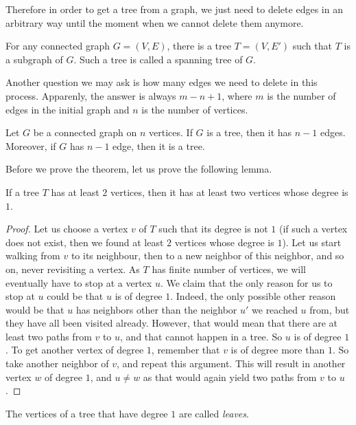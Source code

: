 Therefore in order to get a tree from a graph, we just need to delete edges
in an arbitrary way until the moment when we cannot delete them anymore.
\begin{corollary}
  For any connected graph $G = (V, E)$, there is a tree $T = (V, E')$ such
  that $T$ is a subgraph of $G$. Such a tree is called a spanning tree of $G$.
\end{corollary}

Another question we may ask is how many edges we need to delete in this process.
Apparenly, the answer is always $m - n + 1$, where $m$ is the number of edges in
the initial graph and $n$ is the number of vertices.
\begin{theorem}
\label{theorem:tree-is-minimally-connected}
  Let $G$ be a connected graph on $n$ vertices.
  If $G$ is a tree, then it has $n - 1$ edges. Moreover, if $G$ has $n - 1$
  edge, then it is a tree.
\end{theorem}

Before we prove the theorem, let us prove the following lemma.
\begin{lemma}
  If a tree $T$ has at least $2$ vertices, then it has at least two
  vertices whose degree is $1$.
\end{lemma}
\begin{proof}
  Let us choose a vertex $v$ of $T$ such that its degree is not $1$ (if such a
  vertex does not exist, then we found at least $2$ vertices whose degree is
  $1$). Let us start walking from $v$ to its neighbour, then to a new neighbor
  of this neighbor, and so on, never revisiting a vertex. As $T$ has finite
  number of vertices, we will eventually have to stop at a vertex $u$. We claim
  that the only reason for us to stop at $u$ could be that $u$ is of degree $1$.
  Indeed, the only possible other reason would be that $u$ has neighbors other
  than the neighbor $u'$ we reached $u$ from, but they have all been visited
  already. However, that would mean that there are at least two paths from $v$
  to $u$, and that cannot happen in a tree. So $u$ is of degree $1$. To get
  another vertex of degree $1$, remember that $v$ is of degree more than $1$.
  So take another neighbor of $v$, and repeat this argument. This will result in
  another vertex $w$ of degree $1$, and $u \neq w$ as that would again yield two
  paths from $v$ to $u$.
\end{proof}
The vertices of a tree that have degree $1$ are called \emph{leaves}.


